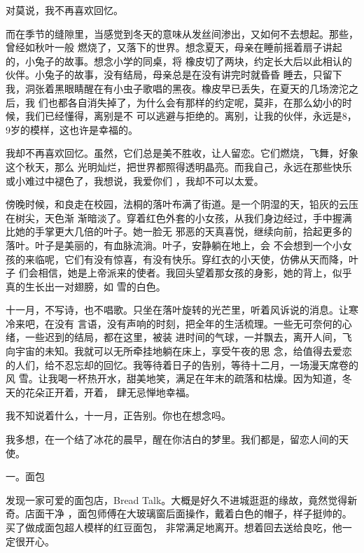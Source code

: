 \documentclass[12pt,a4paper]{article}
\newcommand{\subpart}[1]{
	\begingroup \par
	\vspace{1ex} \centering #1
	\par \endgroup \nopagebreak[4]
}
\begin{document}
		对莫说，我不再喜欢回忆。

		而在季节的缝隙里，当感觉到冬天的意味从发丝间渗出，又如何不去想起。那些，曾经如秋叶一般
	燃烧了，又落下的世界。想念夏天，母亲在睡前摇着扇子讲起的，小兔子的故事。想念小学的同桌，将
	橡皮切了两块，约定长大后以此相认的伙伴。小兔子的故事，没有结局，母亲总是在没有讲完时就昏昏
	睡去，只留下我，洞张着黑眼睛醒在有小虫子歌唱的黑夜。橡皮早已丢失，在夏天的几场滂沱之后，我
	们也都各自消失掉了，为什么会有那样的约定呢，莫非，在那么幼小的时候，我们已经懂得，离别是不
	可以逃避与拒绝的。离别，让我的伙伴，永远是8，9岁的模样，这也许是幸福的。

		我却不再喜欢回忆。虽然，它们总是美不胜收，让人留恋。它们燃烧，飞舞，好象这个秋天，那么
	光明灿烂，把世界都照得透明晶亮。而我自己，永远在那些快乐或小难过中褪色了，我想说，我爱你们
	，我却不可以太爱。


		傍晚时候，和良走在校园，法桐的落叶布满了街道。是一个阴湿的天，铅灰的云压在树尖，天色渐
	渐暗淡了。穿着红色外套的小女孩，从我们身边经过，手中握满比她的手掌更大几倍的叶子。她一脸无
	邪恶的天真喜悦，继续向前，拾起更多的落叶。叶子是美丽的，有血脉流淌。叶子，安静躺在地上，会
	不会想到一个小女孩的来临呢，它们有没有惊喜，有没有快乐。穿红衣的小天使，仿佛从天而降，叶子
	们会相信，她是上帝派来的使者。我回头望着那女孩的身影，她的背上，似乎真的生长出一对翅膀，如
	雪的白色。


		十一月，不写诗，也不唱歌。只坐在落叶旋转的光芒里，听着风诉说的消息。让寒冷来吧，在没有
	言语，没有声响的时刻，把全年的生活梳理。一些无可奈何的心绪，一些迟到的结局，都在这里，被装
	进时间的气球，一并飘去，离开人间，飞向宇宙的未知。我就可以无所牵挂地躺在床上，享受午夜的思
	念，给值得去爱恋的人们，给不忍忘却的回忆。我等待着日子的告别，等待十二月，一场漫天席卷的风
	雪。让我喝一杯热开水，甜美地笑，满足在年末的疏落和枯燥。因为知道，冬天的花朵正开着，开着，
	肆无忌惮地幸福。


		我不知说着什么，十一月，正告别。你也在想念吗。

		我多想，在一个结了冰花的晨早，醒在你洁白的梦里。我们都是，留恋人间的天使。

	\endwriting



		\subpart{一。面包}

		发现一家可爱的面包店，Bread Talk。大概是好久不进城逛逛的缘故，竟然觉得新奇。店面干净
	，面包师傅在大玻璃窗后面操作，戴着白色的帽子，样子挺帅的。买了做成面包超人模样的红豆面包，
	非常满足地离开。想着回去送给良吃，他一定很开心。
\end{document}

